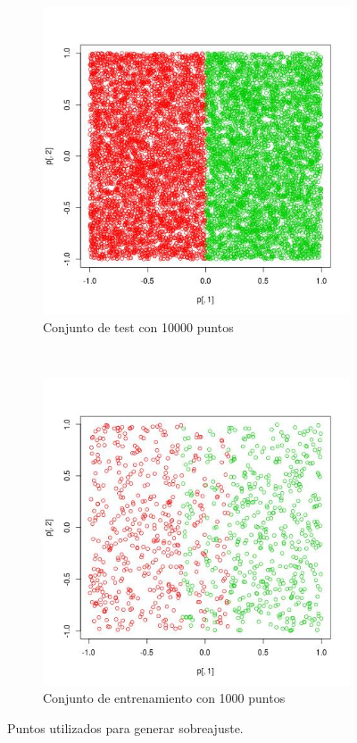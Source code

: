 \documentclass[12pt, a4paper]{article}
\begin{document}
\begin{figure}
    \centering

    \begin{subfigure}[b]{0.45\textwidth}
        \includegraphics[width=\textwidth]{testE}
        \caption{Conjunto de test con 10000 puntos}
    \end{subfigure}
      ~ %
    \begin{subfigure}[b]{0.45\textwidth}
        \includegraphics[width=\textwidth]{datosE}
        \caption{Conjunto de entrenamiento con 1000 puntos}
    \end{subfigure}
    \caption{Puntos utilizados para generar sobreajuste.}
\end{figure}
\end{document}
